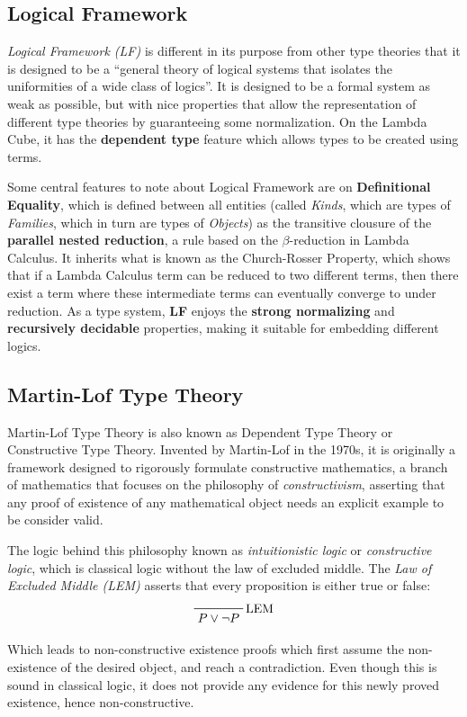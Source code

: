 \documentclass[acmsmall]{acmart}
\begin{document}
\subsection{Logical Framework}
\emph{Logical Framework (LF)} is different in its purpose from other type
theories that it is designed to be a ``general theory of logical systems that
isolates the uniformities of a wide class of logics''\cite{harper1993framework}.
It is designed to be a formal system as weak as possible, but with nice
properties that allow the representation of different type theories by
guaranteeing some normalization. On the Lambda Cube, it has the
\textbf{dependent type} feature which allows types to be created using terms.

Some central features to note about Logical Framework are on
\textbf{Definitional Equality}, which is defined between all entities (called
\emph{Kinds}, which are types of \emph{Families}, which in turn are types of
\emph{Objects}) as the transitive clousure of the \textbf{parallel nested
  reduction}, a rule based on the $\beta$-reduction in Lambda Calculus. It inherits
what is known as the Church-Rosser Property, which shows that if a Lambda
Calculus term can be reduced to two different terms, then there exist a term
where these intermediate terms can eventually converge to under reduction. As a
type system, \textbf{LF} enjoys the \textbf{strong normalizing} and
\textbf{recursively decidable} properties, making it suitable for embedding
different logics.


\subsection{Martin-Lof Type Theory}

Martin-Lof Type Theory is also known as Dependent Type Theory or Constructive
Type Theory. Invented by Martin-Lof in the 1970s, it is originally a framework
designed to rigorously formulate constructive mathematics, a branch of
mathematics that focuses on the philosophy of \emph{constructivism}, asserting
that any proof of existence of any mathematical object needs an explicit example
to be consider valid.

The logic behind this philosophy known as \emph{intuitionistic logic} or
\emph{constructive logic}, which is classical logic without the law of excluded
middle. The \emph{Law of Excluded Middle (LEM)} asserts that every proposition
is either true or false:
\[
\prftree[r]{LEM}{}{P\vee \neg P}
\]

Which leads to non-constructive existence proofs which first assume the
non-existence of the desired object, and reach a contradiction. Even though this
is sound in classical logic, it does not provide any evidence for this newly
proved existence, hence non-constructive.
\end{document}
